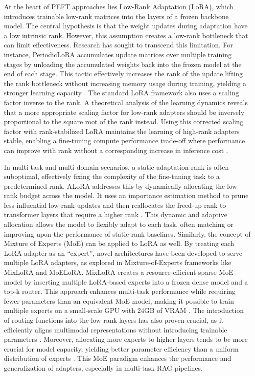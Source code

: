 \documentclass[11pt]{article}
\begin{document}
At the heart of PEFT approaches lies Low-Rank Adaptation (LoRA), which introduces trainable low-rank matrices into the layers of a frozen backbone model. The central hypothesis is that the weight updates during adaptation have a low intrinsic rank. However, this assumption creates a low-rank bottleneck that can limit effectiveness. Research has sought to transcend this limitation. For instance, PeriodicLoRA accumulates update matrices over multiple training stages by unloading the accumulated weights back into the frozen model at the end of each stage. This tactic effectively increases the rank of the update lifting the rank bottleneck without increasing memory usage during training, yielding a stronger learning capacity \cite{ref89}. The standard LoRA framework also uses a scaling factor inverse to the rank. A theoretical analysis of the learning dynamics reveals that a more appropriate scaling factor for low-rank adapters should be inversely proportional to the square root of the rank instead. Using this corrected scaling factor with rank-stabilized LoRA maintains the learning of high-rank adapters stable, enabling a fine-tuning compute performance trade-off where performance can improve with rank without a corresponding increase in inference cost \cite{ref90}.

In multi-task and multi-domain scenarios, a static adaptation rank is often suboptimal, effectively fixing the complexity of the fine-tuning task to a predetermined rank. ALoRA addresses this by dynamically allocating the low-rank budget across the model. It uses an importance estimation method to prune less influential low-rank updates and then reallocates the freed-up rank to transformer layers that require a higher rank \cite{ref91}. This dynamic and adaptive allocation allows the model to flexibly adapt to each task, often matching or improving upon the performance of static-rank baselines. Similarly, the concept of Mixture of Experts (MoE) can be applied to LoRA as well. By treating each LoRA adapter as an ``expert'', novel architectures have been developed to serve multiple LoRA adapters, as explored in Mixture-of-Experts frameworks like MixLoRA and MoELoRA. MixLoRA creates a resource-efficient sparse MoE model by inserting multiple LoRA-based experts into a frozen dense model and a top-k router. This approach enhances multi-task performance while requiring fewer parameters than an equivalent MoE model, making it possible to train multiple experts on a small-scale GPU with 24GB of VRAM \cite{ref92}. The introduction of routing functions into the low-rank layers has also proven crucial, as it efficiently aligns multimodal representations without introducing trainable parameters \cite{ref93}. Moreover, allocating more experts to higher layers tends to be more crucial for model capacity, yielding better parameter efficiency than a uniform distribution of experts \cite{ref94}. This MoE paradigm enhances the performance and generalization of adapters, especially in multi-task RAG pipelines.
\end{document}
